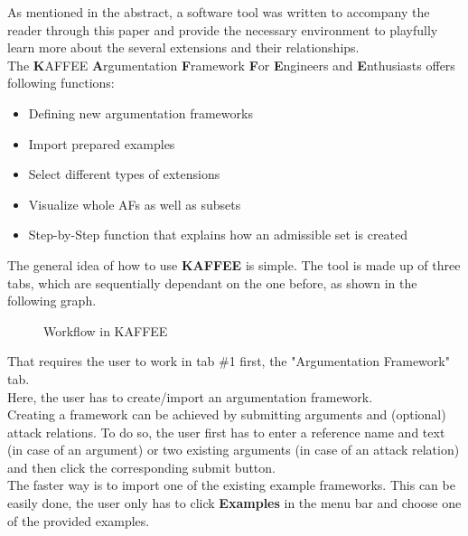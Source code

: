 \documentclass[12pt]{report}
\numberwithin{figure}{chapter}
\theoremstyle{break}
\begin{document}
As mentioned in the abstract, a software tool was written to accompany the reader through this paper and provide the necessary environment to playfully learn more about
the several extensions and their relationships.\\
The \textbf{K}AFFEE \textbf{A}rgumentation \textbf{F}ramework \textbf{F}or \textbf{E}ngineers and \textbf{E}nthusiasts offers following functions:
\begin{itemize}
	\item{Defining new argumentation frameworks}
	\item{Import prepared examples}
	\item{Select different types of extensions}
	\item{Visualize whole AFs as well as subsets}
	\item{Step-by-Step function that explains how an admissible set is created}
\end{itemize}

\bigskip
The general idea of how to use \textbf{KAFFEE} is simple. The tool is made up of three tabs, which are sequentially dependant on the one before, as shown in the following graph.
\bigskip

\begin{figure}[h!]
\begin{center}\end{center}
\caption{Workflow in KAFFEE}
\end{figure}

\bigskip
That requires the user to work in tab \#1 first, the "Argumentation Framework" tab.\\Here, the user has to create/import an argumentation framework.\\
Creating a framework can be achieved by submitting arguments and (optional) attack relations. To do so, the user first has to enter a reference name and text (in case of an argument)
or two existing arguments (in case of an attack relation) and then click the corresponding submit button.\\
The faster way is to import one of the existing example frameworks. This can be easily done, the user only has to click \textbf{Examples} in the menu bar and choose one of the provided
examples.
\end{document}
